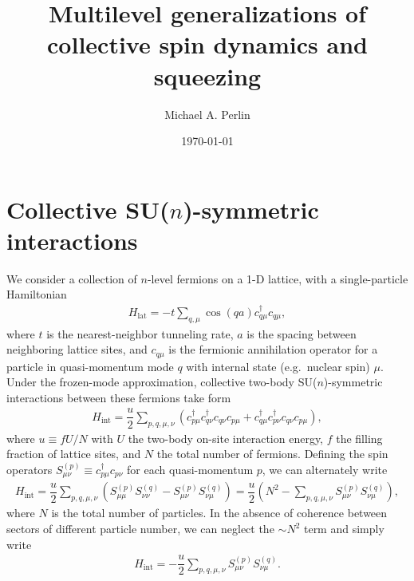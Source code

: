 \documentclass[nofootinbib,notitlepage,11pt]{revtex4-2}
\renewcommand{\t}{\text} %
\newcommand{\f}[2]{\dfrac{#1}{#2}} %
\newcommand{\p}[1]{\left(#1\right)} %
\newcommand{\1}{\mathds{1}}
\begin{document}
\thispagestyle{fancy}

\title{Multilevel generalizations of collective spin dynamics and
  squeezing}%
\author{Michael A. Perlin}%
\date{\today}

\maketitle

\tableofcontents

\section{Collective SU($n$)-symmetric interactions}
\label{sec:int}

We consider a collection of $n$-level fermions on a 1-D lattice, with
a single-particle Hamiltonian
\begin{align}
  H_{\t{lat}} = -t \sum_{q,\mu} \cos\p{qa} c_{q\mu}^\dag c_{q\mu},
  \label{eq:H_lat}
\end{align}
where $t$ is the nearest-neighbor tunneling rate, $a$ is the spacing
between neighboring lattice sites, and $c_{q\mu}$ is the fermionic
annihilation operator for a particle in quasi-momentum mode $q$ with
internal state (e.g.~nuclear spin) $\mu$.  Under the frozen-mode
approximation, collective two-body SU($n$)-symmetric interactions
between these fermions take form
\begin{align}
  H_{\t{int}} = \f{u}{2} \sum_{p,q,\mu,\nu}
  \p{c_{p\mu}^\dag c_{q\nu}^\dag c_{q\nu} c_{p\mu}
    + c_{q\mu}^\dag c_{p\nu}^\dag c_{q\nu} c_{p\mu}},
\end{align}
where $u\equiv fU/N$ with $U$ the two-body on-site interaction energy,
$f$ the filling fraction of lattice sites, and $N$ the total number of
fermions.  Defining the spin operators
$S_{\mu\nu}^{(p)}\equiv c_{p\mu}^\dag c_{p\nu}$ for each
quasi-momentum $p$, we can alternately write
\begin{align}
  H_{\t{int}} = \f{u}{2} \sum_{p,q,\mu,\nu}
  \p{S_{\mu\mu}^{(p)} S_{\nu\nu}^{(q)} - S_{\mu\nu}^{(p)} S_{\nu\mu}^{(q)}}
  = \f{u}{2}\p{N^2 - \sum_{p,q,\mu,\nu}
    S_{\mu\nu}^{(p)} S_{\nu\mu}^{(q)}},
\end{align}
where $N$ is the total number of particles.  In the absence of
coherence between sectors of different particle number, we can neglect
the $\sim N^2$ term and simply write
\begin{align}
  H_{\t{int}}
  = - \f{u}{2} \sum_{p,q,\mu,\nu} S_{\mu\nu}^{(p)} S_{\nu\mu}^{(q)}.
\end{align}
\end{document}
